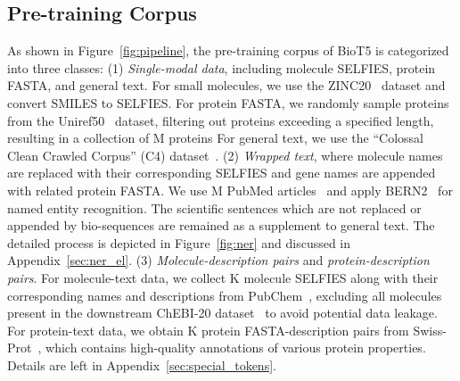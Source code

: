 \documentclass[11pt]{article}
\newcommand{\method}{{BioT5}}
\begin{document}
\subsection{Pre-training Corpus}
As shown in Figure~\ref{fig:pipeline}, the pre-training corpus of \method{} is categorized into three classes:
(1) {\em Single-modal data}, including molecule SELFIES, protein FASTA, and general text.
For small molecules, we use the ZINC20~\citep{irwin2020zinc20} dataset and convert SMILES to SELFIES.
For protein FASTA, we randomly sample proteins from the Uniref50~\citep{suzek2007uniref} dataset, filtering out proteins exceeding a specified length, resulting in a collection of M proteins
For general text, we use the ``Colossal Clean Crawled Corpus'' (C4) dataset~\citep{raffel2020exploring}.
(2) {\em Wrapped text}, where molecule names are replaced with their corresponding SELFIES and gene names are appended with related protein FASTA. 
We use M PubMed articles~\citep{canese2013pubmed} and apply BERN2~\citep{sung2022bern2} for named entity recognition.
The scientific sentences which are not replaced or appended by bio-sequences are remained as a supplement to general text.
The detailed process is depicted in Figure~\ref{fig:ner} and discussed in Appendix~\ref{sec:ner_el}.
(3) {\em Molecule-description pairs} and {\em protein-description pairs}.
For molecule-text data, we collect K molecule SELFIES along with their corresponding names and descriptions from PubChem~\citep{kim2019pug}, excluding all molecules present in the downstream ChEBI-20 dataset~\citep{DBLP:conf/emnlp/EdwardsLRHCJ22} to avoid potential data leakage.
For protein-text data, we obtain K protein FASTA-description pairs from Swiss-Prot~\citep{boutet2007uniprotkb}, which contains high-quality annotations of various protein properties. 
Details are left in Appendix~\ref{sec:special_tokens}.
\end{document}
